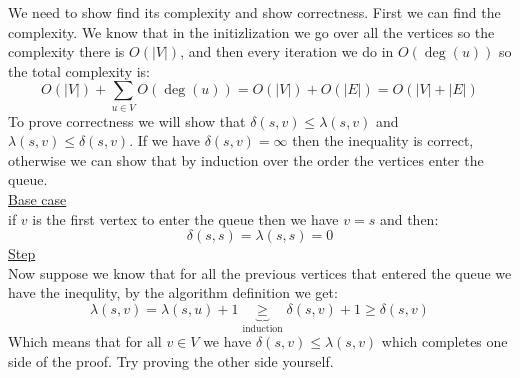 \documentclass[11pt,a4paper]{article}
\theoremstyle{plain}
\begin{document}
	\newpage
	
	
	We need to show find its complexity and show correctness.
	First we can find the complexity. We know that in the initizlization
	we go over all the vertices so the complexity there is $O(|V|)$, and
	then every iteration we do in $O(\deg(u))$ so the total complexity
	is:
	\[
		O(|V|) + \sum_{u\in V}{O(\deg(u))} = O(|V|) + O(|E|) = O(|V|+|E|)
	\]
	To prove correctness we will show that $\delta(s,v) \le \lambda(s,v)$ and 
	$\lambda(s,v) \le \delta(s,v)$. If we have $\delta(s,v)=\infty$ then
	the inequality is correct, otherwise we can show that by induction 
	over the order the vertices enter the queue.\\
	\underline{Base case} \\
	if $v$ is the first vertex to enter the queue then we have $v=s$
	and then:
	\[
		\delta(s,s) = \lambda(s,s) = 0
	\]
	\underline{Step} \\
	Now suppose we know that for all the previous vertices that entered
	the queue we have the inequlity, by the algorithm definition we get:
	\[
		\lambda(s,v) = \lambda(s,u) + 1 \underbrace{\geq}_{\text{induction}} 
		\delta(s,v) + 1 \geq \delta(s,v)
	\]
	Which means that for all $v\in V$ we have $\delta(s,v) \le \lambda(s,v)$
	which completes one side of the proof. Try proving the other side
	yourself.
	
	\newpage
	
\end{document}
